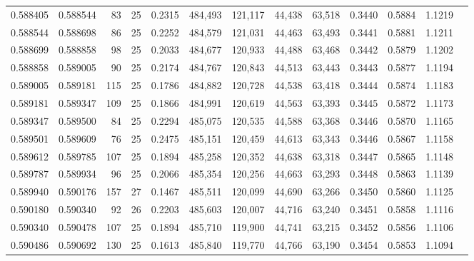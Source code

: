 \begin{tabular}{rrrrrrrrrrrrr}
0.588405 & 0.588544 &    83 &  25 &                                     0.2315 & 484,493 & 121,117 &  44,438 &  63,518 & 0.3440 & 0.5884 & 1.1219 \\
0.588544 & 0.588698 &    86 &  25 &                                     0.2252 & 484,579 & 121,031 &  44,463 &  63,493 & 0.3441 & 0.5881 & 1.1211 \\
0.588699 & 0.588858 &    98 &  25 &                                     0.2033 & 484,677 & 120,933 &  44,488 &  63,468 & 0.3442 & 0.5879 & 1.1202 \\
0.588858 & 0.589005 &    90 &  25 &                                     0.2174 & 484,767 & 120,843 &  44,513 &  63,443 & 0.3443 & 0.5877 & 1.1194 \\
0.589005 & 0.589181 &   115 &  25 &                                     0.1786 & 484,882 & 120,728 &  44,538 &  63,418 & 0.3444 & 0.5874 & 1.1183 \\
0.589181 & 0.589347 &   109 &  25 &                                     0.1866 & 484,991 & 120,619 &  44,563 &  63,393 & 0.3445 & 0.5872 & 1.1173 \\
0.589347 & 0.589500 &    84 &  25 &                                     0.2294 & 485,075 & 120,535 &  44,588 &  63,368 & 0.3446 & 0.5870 & 1.1165 \\
0.589501 & 0.589609 &    76 &  25 &                                     0.2475 & 485,151 & 120,459 &  44,613 &  63,343 & 0.3446 & 0.5867 & 1.1158 \\
0.589612 & 0.589785 &   107 &  25 &                                     0.1894 & 485,258 & 120,352 &  44,638 &  63,318 & 0.3447 & 0.5865 & 1.1148 \\
0.589787 & 0.589934 &    96 &  25 &                                     0.2066 & 485,354 & 120,256 &  44,663 &  63,293 & 0.3448 & 0.5863 & 1.1139 \\
0.589940 & 0.590176 &   157 &  27 &                                     0.1467 & 485,511 & 120,099 &  44,690 &  63,266 & 0.3450 & 0.5860 & 1.1125 \\
0.590180 & 0.590340 &    92 &  26 &                                     0.2203 & 485,603 & 120,007 &  44,716 &  63,240 & 0.3451 & 0.5858 & 1.1116 \\
0.590340 & 0.590478 &   107 &  25 &                                     0.1894 & 485,710 & 119,900 &  44,741 &  63,215 & 0.3452 & 0.5856 & 1.1106 \\
0.590486 & 0.590692 &   130 &  25 &                                     0.1613 & 485,840 & 119,770 &  44,766 &  63,190 & 0.3454 & 0.5853 & 1.1094 \\

\end{tabular}
